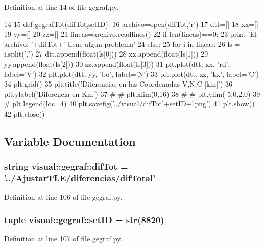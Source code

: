 \-Definition at line 14 of file gegraf.\-py.


\begin{DoxyCode}
14 
15 def gegrafTot(difTot,setID):
16     archivo=open(difTot,'r')
17     dtt=[]
18     xx=[]
19     yy=[]
20     zz=[]
21     lineas=archivo.readlines()
22     if len(lineas)==0:
23         print 'El archivo: '+difTot+' tiene algun problema'
24     else:
25         for i in lineas:
26             ls = i.split(',')
27             dtt.append(float(ls[0]))
28             xx.append(float(ls[1]))
29             yy.append(float(ls[2]))
30             zz.append(float(ls[3]))
31         plt.plot(dtt, xx, 'rd', label='V')
32         plt.plot(dtt, yy, 'bo', label='N')
33         plt.plot(dtt, zz, 'kx', label='C')
34         plt.grid()
35         plt.title('Diferencias en las Coordenadas V,N,C [km]')
36         plt.ylabel('Diferencia en Km')
37 # #         plt.xlim(0,16)
38 # #         plt.ylim(-5.0,2.0)
39 #         plt.legend(loc=4)
40         plt.savefig('../visual/difTot'+setID+'.png')
41         plt.show()
42         plt.close()

\end{DoxyCode}


\subsection{\-Variable \-Documentation}
\subsubsection[{dif\-Tot}]{\setlength{\rightskip}{0pt plus 5cm}string {\bf visual\-::gegraf\-::dif\-Tot} = '../\-Ajustar\-T\-L\-E/diferencias/dif\-Total'}\label{namespacevisual_1_1gegraf_a33ca783c1d8fad77740f5d9112ff86db}


\-Definition at line 106 of file gegraf.\-py.

\subsubsection[{set\-I\-D}]{\setlength{\rightskip}{0pt plus 5cm}tuple {\bf visual\-::gegraf\-::set\-I\-D} = str(8820)}\label{namespacevisual_1_1gegraf_adffd1211763cd8009907ac8d14910bd9}


\-Definition at line 107 of file gegraf.\-py.

